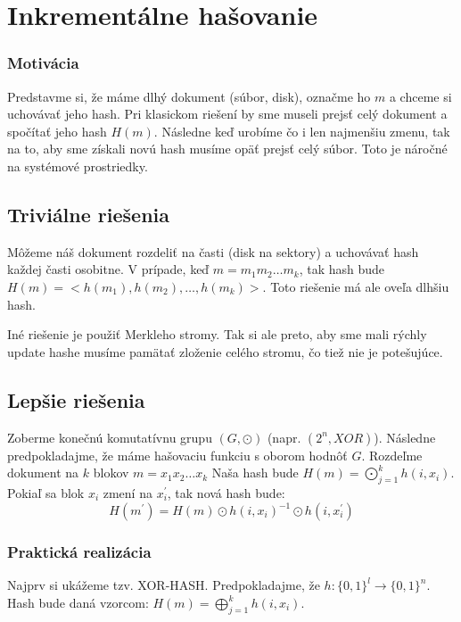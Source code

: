 \section{Inkrementálne hašovanie}

\subsubsection{Motivácia}

Predstavme si, že máme dlhý dokument (súbor, disk),
označme ho $m$ a chceme si uchovávať jeho hash. Pri klasickom riešení
by sme museli prejsť celý dokument a spočítať jeho 
hash $H(m)$. Následne keď urobíme čo i len najmenšiu
zmenu, tak na to, aby sme získali novú hash musíme opäť
prejsť celý súbor. Toto je náročné na systémové prostriedky.

\subsection{Triviálne riešenia}

Môžeme náš dokument rozdeliť na časti (disk na sektory)
a uchovávať hash každej časti osobitne. V prípade, keď
$m = m_1 m_2 \dots m_k$, tak hash bude 
$H(m) = <h(m_1), h(m_2), \dots, h(m_k)>$.
Toto riešenie má ale oveľa dlhšiu hash.

Iné riešenie je použiť Merkleho stromy. Tak si ale preto, aby
sme mali rýchly update hashe musíme pamätať zloženie celého stromu, čo tiež nie je potešujúce.


\subsection{Lepšie riešenia}

Zoberme konečnú komutatívnu grupu $(G, \odot)$ (napr. $(2^n, XOR)$).
Následne predpokladajme, že máme hašovaciu funkciu s oborom hodnôť $G$.
Rozdeľme dokument na $k$ blokov $m = x_1 x_2 \dots x_k$ Naša hash bude 
$H(m) = \displaystyle\bigodot_{j=1}^k h(i, x_i)$. 
Pokiaľ sa blok $x_i$ zmení na $x_i^{'}$, tak nová hash bude:
$$H(m^{'}) = H(m) \odot h(i, x_i)^{-1} \odot h(i, x_i^{'})$$

\subsubsection{Praktická realizácia}

Najprv si ukážeme tzv. XOR-HASH.
Predpokladajme, že $h\colon \{0,1\}^l \to \{0,1\}^n$.
Hash bude daná vzorcom:
$H(m) = \displaystyle\bigoplus_{j=1}^k h(i, x_i)$.

